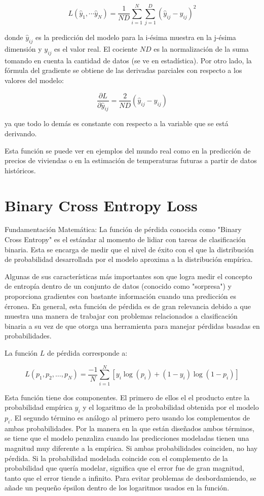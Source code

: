 \documentclass[12pt, letterpaper]{article}
\begin{document}
\[
L(\hat{y}_1,\cdots \hat{y}_N) = \frac{1}{ND}\sum_{i=1}^{N} \sum_{j=1}^{D} (\hat{y}_{ij}-y_{ij})^{2}
\]

donde $\hat{y}_{ij}$ es la predicción del modelo para la i-ésima muestra en la j-ésima dimensión 
y $y_{ij}$ es el valor real. El cociente $ND$ es la normalización de la suma tomando en cuenta 
la cantidad de datos (se ve en estadística). Por otro lado, la fórmula del gradiente se obtiene 
de las derivadas parciales con respecto a los valores del modelo:

\[
\frac{\partial L}{\partial \hat{y}_{ij} } = \frac{2}{ND}(\hat{y}_{ij}-y_{ij})
\]

ya que todo lo demás es constante con respecto a la variable que se está derivando.

Esta función se puede ver en ejemplos del mundo real como en la predicción de precios de viviendas 
o en la estimación de temperaturas futuras a partir de datos históricos.

\newpage

\section{Binary Cross Entropy Loss}


Fundamentación Matemática: La función de pérdida conocida como "Binary Cross Entropy" es el estándar al momento de lidiar con tareas de clasificación binaria. Esta se encarga de medir que el nivel de éxito con el que la distribución de probabilidad desarrollada por el modelo aproxima a la distribución empírica.

Algunas de sus características más importantes son que logra medir el concepto de entropía dentro de un conjunto de datos (conocido como "sorpresa") y proporciona gradientes con bastante información cuando una predicción es érronea. En general, esta función de pérdida es de gran relevancia debido a que muestra una manera de trabajar con problemas relacionados a clasificación binaria a su vez de que otorga una herramienta para manejar pérdidas basadas en probabilidades.

La función $L$ de pérdida corresponde a: 

$$L(p_1,p_2,\dots,p_N) = \frac{-1}{N} \sum_{i=1}^{N}[y_i \log(p_i)+(1-y_i)\log (1-p_i)]$$

Esta función tiene dos componentes. El primero de ellos el el producto entre la probabilidad empírica $y_i$ y el logaritmo de la probabilidad obtenida por el modelo $p_i$. El segundo término es análogo al primero pero usando los complementos de ambas probabilidades. Por la manera en la que están diseñados ambos términos, se tiene que el modelo penzaliza cuando las predicciones modeladas tienen una magnitud muy diferente a la empírica. Si ambas probabilidades coinciden, no hay pérdida. Si la probabilidad modelada coincide con el complemento de la probabilidad que quería modelar, significa que el error fue de gran magnitud, tanto que el error tiende a infinito. Para evitar problemas de desbordamiendo, se añade un pequeño épsilon dentro de los logaritmos usados en la función.
\end{document}
